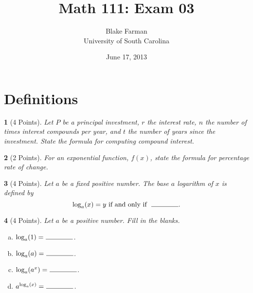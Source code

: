 \documentclass[12pt]{amsart}
\author{Blake Farman\\University of South Carolina}
\title{Math 111: Exam 03}
\date{June 17, 2013}
\begin{document}
\maketitle

\begin{center}
\end{center}

\vspace{0.2in}
\vspace{0.2in}

\theoremstyle{plain}
\newtheorem{thm}{}
\newtheorem{lem}{Lemma}
\theoremstyle{definition}
\newtheorem{defn}{Definition}

\section{Definitions}
\begin{thm}[4 Points]\label{ex1}
  Let $P$ be a principal investment, $r$ the interest rate, $n$ the number of times interest compounds per year, and $t$ the number of years since the investment.
  State the formula for computing compound interest.
  \vspace{1in}
\end{thm}

\begin{thm}[2 Points]\label{ex2}
  For an exponential function, $f(x)$, state the formula for percentage rate of change.
  \vspace{1 in}
\end{thm}

\begin{thm}[4 Points]\label{ex3}
  Let $a$ be a fixed positive number.
  The base $a$ logarithm of $x$ is defined by
  $$\log_a(x) = y\  \text{if and only if}\ \ \line(1,0){40}.$$
\end{thm}

\newpage

\begin{thm}[4 Points]\label{ex4}
  Let $a$ be a positive number.  Fill in the blanks.
  \begin{enumerate}[(a)]
  \item
    $\log_a(1) = \ \line(1,0){40}$.
  \item
    $\log_a(a) = \ \line(1,0){40}$.
  \item
    $\log_a(a^x) = \ \line(1,0){40}$.
  \item
    $a^{\log_a(x)} = \ \line(1,0){40}$.
  \end{enumerate}
  \vspace{1in}
\end{thm}
\end{document}
